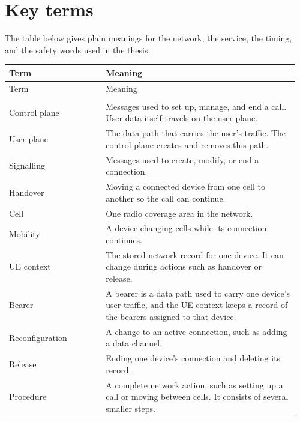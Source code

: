 \documentclass[english,oneside,a4paper,censored,csm,software-track-2020]{HYthesisML}
\begin{document}
\endgroup

\cleardoublepage
{}
{}
\chapter*{Key terms}
\label{appendix:terms}

\noindent The table below gives plain meanings for the network, the service, the timing, and the safety
words used in the thesis.     

\begingroup
\singlespacing
\setlength{\tabcolsep}{3pt}
\renewcommand{\arraystretch}{1.05}
\begin{longtable}{@{}>{\scriptsize\raggedright\arraybackslash}p{0.32\linewidth} >{\scriptsize\raggedright\arraybackslash}p{0.64\linewidth}@{}}
\hline\hline
Term & Meaning \\
\hline
\endfirsthead
\hline\hline
Term & Meaning \\
\hline
\endhead
\multicolumn{2}{@{}l}{\scriptsize\emph{Network}}\\*[1pt]
Control plane & Messages used to set up, manage, and end a call. User data itself travels on the user plane. \\
User plane & The data path that carries the user’s traffic. The control plane creates and removes this path. \\
Signalling & Messages used to create, modify, or end a connection. \\
Handover & Moving a connected device from one cell to another so the call can continue. \\
Cell & One radio coverage area in the network. \\
Mobility & A device changing cells while its connection continues. \\
UE context & The stored network record for one device. It can change during actions such as handover or release. \\
Bearer & A bearer is a data path used to carry one device’s user traffic, and the UE context keeps a record of the bearers assigned to that device. \\
Reconfiguration & A change to an active connection, such as adding a data channel. \\
Release & Ending one device's connection and deleting its record. \\
Procedure & A complete network action, such as setting up a call or moving between cells. It consists of several smaller steps. \\

\end{longtable}
\end{document}
